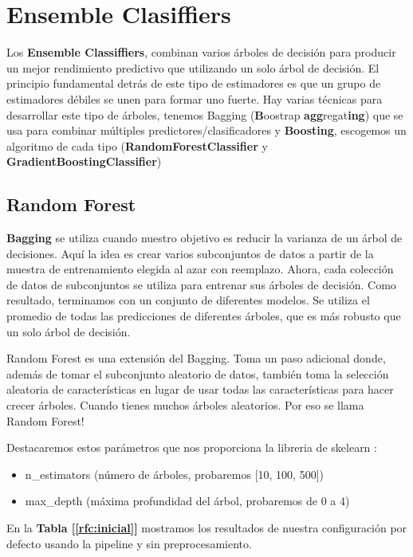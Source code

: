 \documentclass[12pt,twoside]{report}
\begin{document}
\section*{Ensemble Clasiffiers}
Los \textbf{Ensemble Classiffiers}, combinan varios árboles de decisión para producir un mejor rendimiento predictivo que utilizando un solo árbol de decisión. El principio fundamental detrás de este tipo de estimadores es que un grupo de estimadores débiles se unen para formar uno fuerte. Hay varias técnicas para desarrollar este tipo de árboles, tenemos  Bagging (\textbf{B}oostrap \textbf{agg}regat\textbf{ing}) que se usa para combinar múltiples predictores/clasificadores y \textbf{Boosting}, escogemos un algoritmo de cada tipo (\textbf{RandomForestClassifier} y \textbf{GradientBoostingClassifier})

\subsection*{Random Forest}
\textbf{Bagging} se utiliza cuando nuestro objetivo es reducir la varianza de un árbol de decisiones. Aquí la idea es crear varios subconjuntos de datos a partir de la muestra de entrenamiento elegida al azar con reemplazo. Ahora, cada colección de datos de subconjuntos se utiliza para entrenar sus árboles de decisión. Como resultado, terminamos con un conjunto de diferentes modelos. Se utiliza el promedio de todas las predicciones de diferentes árboles, que es más robusto que un solo árbol de decisión. 

Random Forest es una extensión del Bagging. Toma un paso adicional donde, además de tomar el subconjunto aleatorio de datos, también toma la selección aleatoria de características en lugar de usar todas las características para hacer crecer árboles. Cuando tienes muchos árboles aleatorios. Por eso se llama Random Forest!

Destacaremos estos parámetros que nos proporciona la libreria de skelearn \cite{rfc}:
        
\begin{itemize}
	\item n\_estimators (número de árboles, probaremos  [10, 100, 500])
	\item max\_depth (máxima profundidad del árbol, probaremos de 0 a 4)
\end{itemize}

En la \textbf{Tabla [\ref{rfc:inicial}]} mostramos los resultados de nuestra configuración por defecto usando la pipeline y sin preprocesamiento.
\end{document}

